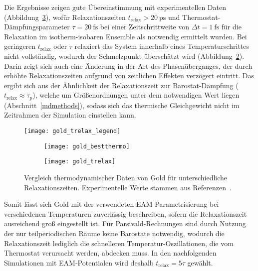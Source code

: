 Die Ergebnisse zeigen gute Übereinstimmung mit experimentellen Daten\cite{haynes_crc_2011,brillo_density_2006} (Abbildung~\ref{fig:goldthermo}), wofür Relaxationszeiten $t_\text{relax} > \SI{20}{\pico\second}$ und Thermostat-Dämpfungsparameter $\tau = \SI{20}{\femto\second}$ bei einer Zeitschrittweite von $\Delta t = \SI{1}{\femto\second}$ für die Relaxation im isotherm-isobaren Ensemble als notwendig ermittelt wurden.
Bei geringeren $t_\text{relax}$ oder $\tau$ relaxiert das System innerhalb eines Temperaturschrittes nicht vollständig, wodurch der Schmelzpunkt überschätzt wird (Abbildung~\ref{fig:goldthermo-b}).
Darin zeigt sich auch eine Änderung in der Art des Phasenüberganges, der durch erhöhte Relaxationszeiten aufgrund von zeitlichen Effekten verzögert eintritt.
Das ergibt sich aus der Ähnlichkeit der Relaxationszeit zur Barostat-Dämpfung ($t_\text{relax}\approx \tau_p$), welche um Größenordnungen unter dem notwendigen Wert liegen (Abschnitt~\ref{mdmethods}), sodass sich das thermische Gleichgewicht nicht im Zeitrahmen der Simulation einstellen kann.

\begin{figure}[tbh]

  \centering
  \captionsetup[subfigure]{singlelinecheck=false}

  \texttt{[image: gold\_trelax\_legend]}

  \def\subfigwidth{7cm}
  \begin{subfigure}[t]{\subfigwidth}
    \texttt{[image: gold\_bestthermo]}
    \label{fig:goldthermo-a}
  \end{subfigure}
  \hfill
  \begin{subfigure}[t]{\subfigwidth}
    \texttt{[image: gold\_trelax]}
    \label{fig:goldthermo-b}
  \end{subfigure}

  \caption[Vergleich thermodynamischer Daten von Gold]{
    Vergleich thermodynamischer Daten von Gold für unterschiedliche Relaxationszeiten.
    Experimentelle Werte stammen aus Referenzen~\cite{haynes_crc_2011,brillo_density_2006}.
  }
  \label{fig:goldthermo}
\end{figure}

Somit lässt sich Gold mit der verwendeten EAM-Parametrisierung bei verschiedenen Temperaturen zuverlässig beschreiben, sofern die Relaxationszeit ausreichend groß eingestellt ist.
Für Parsivald-Rechnungen sind durch Nutzung der nur teilperiodischen Räume keine Barostate notwendig, wodurch die Relaxationszeit lediglich die schnelleren Temperatur-Oszillationen, die vom Thermostat verursacht werden, abdecken muss.
In den nachfolgenden Simulationen mit EAM-Potentialen wird deshalb $t_\text{relax} = 5 \tau$ gewählt.

